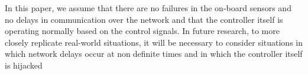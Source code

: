 \documentclass[conference]{IEEEtran}
\begin{document}
In this paper, we assume that there are no failures in the
on-board sensors and no delays in communication over the
network and that the controller itself is operating normally
based on the control signals. In future research, to more
closely replicate real-world situations, it will be necessary
to consider situations in which network delays occur at nondefinite times and in which the controller itself is hijacked


\end{document}
